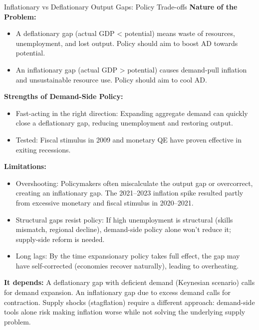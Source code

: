 \documentclass[11pt, a4paper, twoside]{book}
\begin{document}
\begin{evaluation}{Inflationary vs Deflationary Output Gaps: Policy Trade-offs}
\textbf{Nature of the Problem:}
\begin{itemize}
  \item A deflationary gap (actual GDP < potential) means waste of resources, unemployment, and lost output. Policy should aim to boost AD towards potential.
  \item An inflationary gap (actual GDP > potential) causes demand-pull inflation and unsustainable resource use. Policy should aim to cool AD.
\end{itemize}

\textbf{Strengths of Demand-Side Policy:}
\begin{itemize}
  \item Fast-acting in the right direction: Expanding aggregate demand can quickly close a deflationary gap, reducing unemployment and restoring output.
  \item Tested: Fiscal stimulus in 2009 and monetary QE have proven effective in exiting recessions.
\end{itemize}

\textbf{Limitations:}
\begin{itemize}
  \item Overshooting: Policymakers often miscalculate the output gap or overcorrect, creating an inflationary gap. The 2021--2023 inflation spike resulted partly from excessive monetary and fiscal stimulus in 2020--2021.
  \item Structural gaps resist policy: If high unemployment is structural (skills mismatch, regional decline), demand-side policy alone won't reduce it; supply-side reform is needed.
  \item Long lags: By the time expansionary policy takes full effect, the gap may have self-corrected (economies recover naturally), leading to overheating.
\end{itemize}

\textbf{It depends:}
A deflationary gap with deficient demand (Keynesian scenario) calls for demand expansion. An inflationary gap due to excess demand calls for contraction. Supply shocks (stagflation) require a different approach: demand-side tools alone risk making inflation worse while not solving the underlying supply problem.
\end{evaluation}
\end{document}
